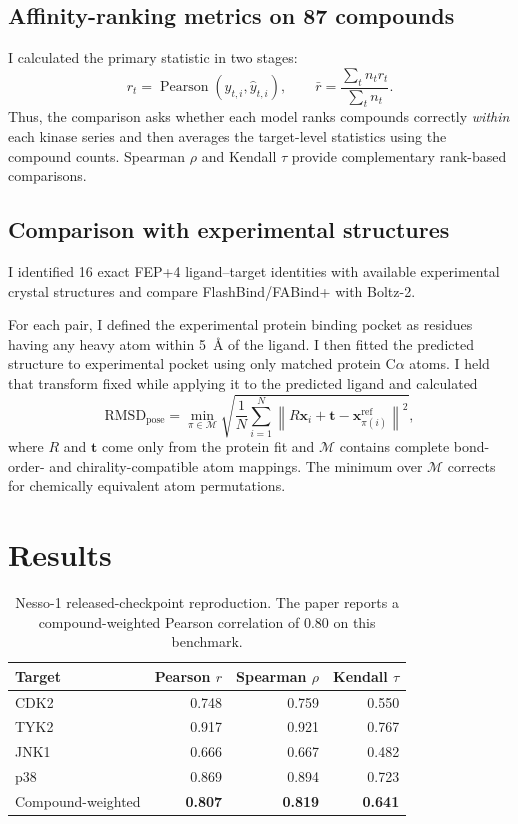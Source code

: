 \documentclass[11pt]{article}
\begin{document}
\subsection{Affinity-ranking metrics on 87 compounds}

I calculated the primary statistic in two stages:
\[
 r_t = \operatorname{Pearson}\!\left(y_{t,i},\hat y_{t,i}\right),
 \qquad
 \bar r = \frac{\sum_t n_t r_t}{\sum_t n_t}.
\]
Thus, the comparison asks whether each model ranks compounds correctly
\emph{within} each kinase series and then averages the target-level statistics
using the compound counts. Spearman $\rho$ and Kendall $\tau$ provide
complementary rank-based comparisons.

\subsection{Comparison with experimental structures}

I identified 16 exact
FEP+4 ligand--target identities with available experimental crystal structures and compare FlashBind/FABind+ with Boltz-2.

For each pair, I defined the
experimental protein binding pocket as residues having any heavy atom within 5~\AA{} of the ligand. I then fitted the predicted structure to experimental pocket using only
matched protein C$\alpha$ atoms. I held that transform fixed while applying it
to the predicted ligand and calculated
\[
  \mathrm{RMSD}_{\mathrm{pose}}
  = \min_{\pi\in\mathcal{M}}
  \sqrt{\frac{1}{N}\sum_{i=1}^{N}
  \left\|R\mathbf{x}_i+\mathbf{t}-\mathbf{x}^{\mathrm{ref}}_{\pi(i)}\right\|^2},
\]
where $R$ and $\mathbf{t}$ come only from the protein fit and
$\mathcal{M}$ contains complete bond-order- and chirality-compatible atom
mappings. The minimum over $\mathcal{M}$ corrects for chemically equivalent
atom permutations.

\section{Results}

\begin{table}[H]
\centering
\small
\begin{tabular}{lrrr}
\toprule
Target & Pearson $r$ & Spearman $\rho$ & Kendall $\tau$ \\
\midrule
CDK2 & 0.748 & 0.759 & 0.550 \\
TYK2 & 0.917 & 0.921 & 0.767 \\
JNK1 & 0.666 & 0.667 & 0.482 \\
p38  & 0.869 & 0.894 & 0.723 \\
\midrule
\rowcolor{nessobg}
Compound-weighted & \textbf{0.807} & \textbf{0.819} & \textbf{0.641} \\
\bottomrule
\end{tabular}
\caption{Nesso-1 released-checkpoint reproduction. The paper reports a
compound-weighted Pearson correlation of 0.80 on this benchmark.}
\end{table}
\end{document}

